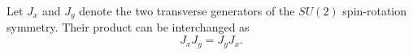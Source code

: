 \documentclass{article}
\begin{document}
Let $J_x$ and $J_y$ denote the two transverse generators of the $SU(2)$
spin-rotation symmetry.  Their product can be interchanged as
\begin{equation}
J_x J_y = J_y J_x .
\label{eq:su2-exchange}
\end{equation}
\end{document}
